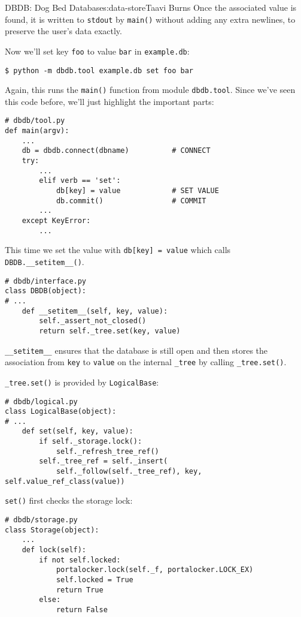 \begin{aosachapter}{DBDB: Dog Bed Database}{s:data-store}{Taavi Burns}
Once the associated value is found, it is written to \texttt{stdout} by
\texttt{main()} without adding any extra newlines, to preserve the
user's data exactly.

\label{inserting-and-updating}

Now we'll set key \texttt{foo} to value \texttt{bar} in
\texttt{example.db}:

\begin{verbatim}
$ python -m dbdb.tool example.db set foo bar
\end{verbatim}

Again, this runs the \texttt{main()} function from module
\texttt{dbdb.tool}. Since we've seen this code before, we'll just
highlight the important parts:

\begin{verbatim}
# dbdb/tool.py
def main(argv):
    ...
    db = dbdb.connect(dbname)          # CONNECT
    try:
        ...
        elif verb == 'set':
            db[key] = value            # SET VALUE
            db.commit()                # COMMIT
        ...
    except KeyError:
        ...
\end{verbatim}

This time we set the value with \texttt{db{[}key{]} = value} which calls
\texttt{DBDB.\_\_setitem\_\_()}.

\begin{verbatim}
# dbdb/interface.py
class DBDB(object):
# ...
    def __setitem__(self, key, value):
        self._assert_not_closed()
        return self._tree.set(key, value)
\end{verbatim}

\texttt{\_\_setitem\_\_} ensures that the database is still open and
then stores the association from \texttt{key} to \texttt{value} on the
internal \texttt{\_tree} by calling \texttt{\_tree.set()}.

\texttt{\_tree.set()} is provided by \texttt{LogicalBase}:

\begin{verbatim}
# dbdb/logical.py
class LogicalBase(object):
# ...
    def set(self, key, value):
        if self._storage.lock():
            self._refresh_tree_ref()
        self._tree_ref = self._insert(
            self._follow(self._tree_ref), key, self.value_ref_class(value))
\end{verbatim}

\texttt{set()} first checks the storage lock:

\begin{verbatim}
# dbdb/storage.py
class Storage(object):
    ...
    def lock(self):
        if not self.locked:
            portalocker.lock(self._f, portalocker.LOCK_EX)
            self.locked = True
            return True
        else:
            return False
\end{verbatim}


\end{aosachapter}
